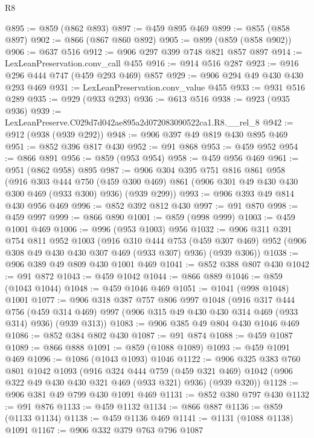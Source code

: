 \begin{lexlean}{R8}
\begin{coremodule}
@895 := @859 (@862 @893)
@897 := @459 @895 @469
@899 := @855 (@858 @897)
@902 := @866 (@867 @860 @892)
@905 := @899 (@859 (@858 @902))
@906 := @637 @516
@912 := @906 @297 @399 @748 @821 @857 @897
@914 := LexLeanPreservation.conv_call @455
@916 := @914 @516 @287
@923 := @916 @296 @444 @747 (@459 @293 @469) @857
@929 := @906 @294 @49 @430 @430 @293 @469
@931 := LexLeanPreservation.conv_value @455
@933 := @931 @516 @289
@935 := @929 (@933 @293)
@936 := @613 @516
@938 := @923 (@935 @936)
@939 := LexLeanPreserve.C029d7d042ae895a2d072083090522ca1.R8.__rel_8
@942 := @912 (@938 (@939 @292))
@948 := @906 @397 @49 @819 @430 @895 @469
@951 := @852 @396 @817 @430
@952 := @91 @868
@953 := @459 @952
@954 := @866 @891
@956 := @859 (@953 @954)
@958 := @459 @956 @469
@961 := @951 (@862 @958) @895
@987 := @906
    @304
    @395
    @751
    @816
    @861
    @958
    (@916
      @303
      @444
      @750
      (@459 @300 @469)
      @861
      (@906 @301 @49 @430 @430 @300 @469 (@933 @300) @936)
      (@939 @299))
@993 := @906 @393 @49 @814 @430 @956 @469
@996 := @852 @392 @812 @430
@997 := @91 @870
@998 := @459 @997
@999 := @866 @890
@1001 := @859 (@998 @999)
@1003 := @459 @1001 @469
@1006 := @996 (@953 @1003) @956
@1032 := @906
    @311
    @391
    @754
    @811
    @952
    @1003
    (@916
      @310
      @444
      @753
      (@459 @307 @469)
      @952
      (@906 @308 @49 @430 @430 @307 @469 (@933 @307) @936)
      (@939 @306))
@1038 := @906 @389 @49 @809 @430 @1001 @469
@1041 := @852 @388 @807 @430
@1042 := @91 @872
@1043 := @459 @1042
@1044 := @866 @889
@1046 := @859 (@1043 @1044)
@1048 := @459 @1046 @469
@1051 := @1041 (@998 @1048) @1001
@1077 := @906
    @318
    @387
    @757
    @806
    @997
    @1048
    (@916
      @317
      @444
      @756
      (@459 @314 @469)
      @997
      (@906 @315 @49 @430 @430 @314 @469 (@933 @314) @936)
      (@939 @313))
@1083 := @906 @385 @49 @804 @430 @1046 @469
@1086 := @852 @384 @802 @430
@1087 := @91 @874
@1088 := @459 @1087
@1089 := @866 @888
@1091 := @859 (@1088 @1089)
@1093 := @459 @1091 @469
@1096 := @1086 (@1043 @1093) @1046
@1122 := @906
    @325
    @383
    @760
    @801
    @1042
    @1093
    (@916
      @324
      @444
      @759
      (@459 @321 @469)
      @1042
      (@906 @322 @49 @430 @430 @321 @469 (@933 @321) @936)
      (@939 @320))
@1128 := @906 @381 @49 @799 @430 @1091 @469
@1131 := @852 @380 @797 @430
@1132 := @91 @876
@1133 := @459 @1132
@1134 := @866 @887
@1136 := @859 (@1133 @1134)
@1138 := @459 @1136 @469
@1141 := @1131 (@1088 @1138) @1091
@1167 := @906
    @332
    @379
    @763
    @796
    @1087

\end{coremodule}
\end{lexlean}
